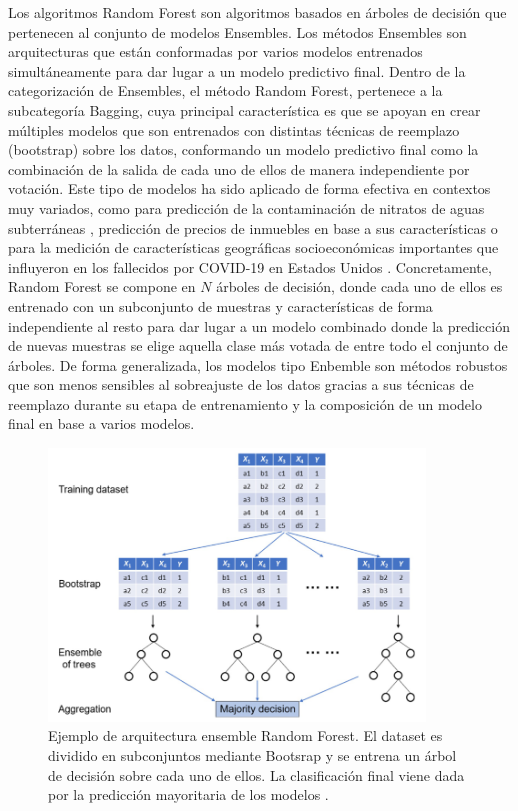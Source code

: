 \documentclass{uathesis-es}
\begin{document}
Los algoritmos Random Forest son algoritmos basados en árboles de decisión que pertenecen al conjunto de modelos Ensembles. Los métodos Ensembles son arquitecturas que están conformadas por varios modelos entrenados simultáneamente para dar lugar a un modelo predictivo final. Dentro de la categorización de Ensembles, el método Random Forest, pertenece a la subcategoría Bagging, cuya principal característica es que se apoyan en crear múltiples modelos que son entrenados con distintas técnicas de reemplazo (bootstrap) sobre los datos, conformando un modelo predictivo final como la combinación de la salida de cada uno de ellos de manera independiente por votación. Este tipo de modelos ha sido aplicado de forma efectiva en contextos muy variados, como para predicción de la contaminación de nitratos de aguas subterráneas \cite{HE2022133388}, predicción de precios de inmuebles en base a sus características \cite{ADETUNJI2022806} o para la medición de características geográficas socioeconómicas importantes que influyeron en los fallecidos por COVID-19 en Estados Unidos \cite{GREKOUSIS2022102744}. Concretamente, Random Forest se compone en $N$ árboles de decisión, donde cada uno de ellos es entrenado con un subconjunto de muestras y características de forma independiente al resto para dar lugar a un modelo combinado donde la predicción de nuevas muestras se elige aquella clase más votada de entre todo el conjunto de árboles. De forma generalizada, los modelos tipo Enbemble son métodos robustos que son menos sensibles al sobreajuste de los datos gracias a sus técnicas de reemplazo durante su etapa de entrenamiento y la composición de un modelo final en base a varios modelos.


\begin{figure}[H]
    \centering
    \includegraphics[width=10cm]{Figures/Background/RF.png}
    \caption{Ejemplo de arquitectura ensemble Random Forest. El dataset es dividido en subconjuntos mediante Bootsrap y se entrena un árbol de decisión sobre cada uno de ellos. La clasificación final viene dada por la predicción mayoritaria de los modelos \cite{MISRA2020243}.}
    \label{GA_inicializacion}
\end{figure}
\end{document}
